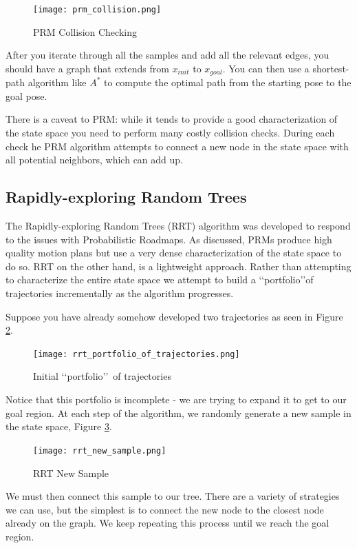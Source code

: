 \documentclass[twoside]{article}
\begin{document}
\begin{figure}[H]
  \centering
  \texttt{[image: prm\_collision.png]}
  \caption{PRM Collision Checking}
  \label{fig:prm_collision}
\end{figure}


After you iterate through all the samples and add all the relevant edges, you should have a graph that extends from $x_{init}$ to $x_{goal}$. You can then use a shortest-path algorithm like $A^*$ to compute the optimal path from the starting pose to the goal pose.

There is a caveat to PRM: while it tends to provide a good characterization of the state space you need to perform many costly collision checks. During each check he PRM algorithm attempts to connect a new node in the state space with all potential neighbors, which can add up.

\subsection{Rapidly-exploring Random Trees}
The Rapidly-exploring Random Trees (RRT) algorithm was developed to respond to the issues with Probabilistic Roadmaps. As discussed, PRMs produce high quality motion plans but use a very dense characterization of the state space to do so. RRT on the other hand, is a lightweight approach. Rather than attempting to characterize the entire state space we attempt to build a \lq\lq portfolio\rq\rq of trajectories incrementally as the algorithm progresses.

Suppose you have already somehow developed two trajectories as seen in Figure \ref{fig:rrt_portfolio}.

\begin{figure}[H]
  \centering
  \texttt{[image: rrt\_portfolio\_of\_trajectories.png]}
  \caption{Initial \lq\lq portfolio\rq\rq\ of trajectories}
  \label{fig:rrt_portfolio}
\end{figure}

Notice that this portfolio is incomplete - we are trying to expand it to get to our goal region. At each step of the algorithm, we randomly generate a new sample in the state space, Figure \ref{fig:rrt_new_sample}.

\begin{figure}[H]
  \centering
  \texttt{[image: rrt\_new\_sample.png]}
  \caption{RRT New Sample}
  \label{fig:rrt_new_sample}
\end{figure}

We must then connect this sample to our tree. There are a variety of strategies we can use, but the simplest is to connect the new node to the closest node already on the graph. We keep repeating this process until we reach the goal region.
\end{document}
